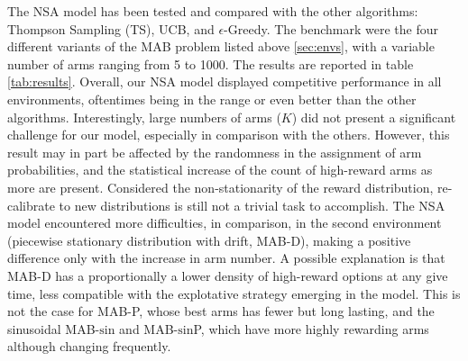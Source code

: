 The NSA model has been tested and compared with the other algorithms: Thompson Sampling (TS), UCB, and $\epsilon$-Greedy.
The benchmark were the four different variants of the MAB problem listed above \ref{sec:envs}, with a variable number of arms ranging from 5 to 1000.
The results are reported in table \ref{tab:results}.
Overall, our NSA model displayed competitive performance in all environments, oftentimes being in the range or even better than the other algorithms.
Interestingly, large numbers of arms ($K$) did not present a significant challenge for our model, especially in comparison with the others.
However, this result may in part be affected by the randomness in the assignment of arm probabilities, and the statistical increase of the count of high-reward arms as more are present.
Considered the non-stationarity of the reward distribution, re-calibrate to new distributions is still not a trivial task to accomplish.
The NSA model encountered more difficulties, in comparison, in the second environment (piecewise stationary distribution with drift, MAB-D), making a positive difference only with the increase in arm number.
A possible explanation is that MAB-D has a proportionally a lower density of high-reward options at any give time, less compatible with the explotative strategy emerging in the model.
This is not the case for MAB-P, whose best arms has fewer but long lasting, and the sinusoidal MAB-$\text{sin}$ and MAB-$\text{sin}$P, which have more highly rewarding arms although changing frequently.



